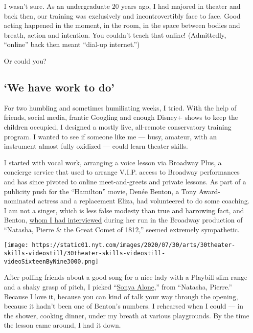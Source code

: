 I wasn't sure. As an undergraduate 20 years ago, I had majored in
theater and back then, our training was exclusively and incontrovertibly
face to face. Good acting happened in the moment, in the room, in the
space between bodies and breath, action and intention. You couldn't
teach that online! (Admittedly, ``online'' back then meant ``dial-up
internet.'')

Or could you?

\hypertarget{we-have-work-to-do}{%
\subsection{`We have work to do'}\label{we-have-work-to-do}}

For two humbling and sometimes humiliating weeks, I tried. With the help
of friends, social media, frantic Googling and enough Disney+ shows to
keep the children occupied, I designed a mostly live, all-remote
conservatory training program. I wanted to see if someone like me ---
busy, amateur, with an instrument almost fully oxidized --- could learn
theater skills.

I started with vocal work, arranging a voice lesson via
\href{https://broadwayplus.com/}{Broadway Plus}, a concierge service
that used to arrange V.I.P. access to Broadway performances and has
since pivoted to online meet-and-greets and private lessons. As part of
a publicity push for the ``Hamilton'' movie, Denée Benton, a Tony
Award-nominated actress and a replacement Eliza, had volunteered to do
some coaching. I am not a singer, which is less false modesty than true
and harrowing fact, and Benton,
\href{https://www.nytimes.com/2017/05/11/theater/denee-benton-tony-nominee-embraces-her-inner-natasha.html}{whom
I had interviewed} during her run in the Broadway production of
``\href{https://www.nytimes.com/2016/11/15/theater/natasha-pierre-and-the-great-comet-of-1812-review.html}{Natasha,
Pierre \& the Great Comet of 1812,}'' seemed extremely sympathetic.

\texttt{[image: https://static01.nyt.com/images/2020/07/30/arts/30theater-skills-videostill/30theater-skills-videostill-videoSixteenByNine3000.png]}

After polling friends about a good song for a nice lady with a
Playbill-slim range and a shaky grasp of pitch, I picked
``\href{https://www.youtube.com/watch?v=_HHmHv26tao}{Sonya Alone},''
from ``Natasha, Pierre.'' Because I love it, because you can kind of
talk your way through the opening, because it hadn't been one of
Benton's numbers. I rehearsed when I could --- in the shower, cooking
dinner, under my breath at various playgrounds. By the time the lesson
came around, I had it down.

